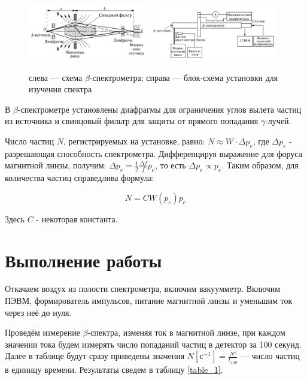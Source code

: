 \documentclass[12pt]{kiarticle} %
\begin{document}
	\begin{figure}[h]
	\centering
	\includegraphics[width=0.48\textwidth]{lab}
	\hfill
	\includegraphics[width=0.48\textwidth]{lab2}
	\caption{слева --- схема $\beta$-спектрометра; справа --- блок-схема установки для изучения спектра}
	\label{pic:scheme}
\end{figure}

В $\beta$-спектрометре установлены диафрагмы для ограничения углов вылета частиц из источника и свинцовый фильтр для защиты от прямого попадания $\gamma$-лучей. 

Число частиц $N$, регистрируемых на установке, равно: $N \approx W \cdot \Delta p_e$, где $\Delta p_e$ - разрешающая способность спектрометра. Дифференцируя выражение для форуса магнитной линзы, получим: $\Delta p_e = \frac{1}{2}\frac{\Delta f}{f}p_e$, то есть $\Delta p_e \propto p_e$. Таким образом, для количества частиц справедлива формула: 

\begin{equation}\label{N}
 N = CW(p_e)p_e 
\end{equation}

Здесь $C$ - некоторая константа.


\section{Выполнение работы}

Откачаем воздух из полости спектрометра, включим вакуумметр. Включим ПЭВМ, формирователь импульсов, питание магнитной линзы и уменьшим ток через неё до нуля. 

Проведём измерение $\beta$-спектра, изменяя ток в магнитной линзе, при каждом значении тока будем измерять число попаданий частиц в детектор за 100 секунд. Далее в таблице будут сразу приведены значения $ N[с^{-1}] = \frac{N'}{t_{100}} $ --- число частиц в единицу времени. Результаты сведем в таблицу \ref{table_1}. 
\end{document}
